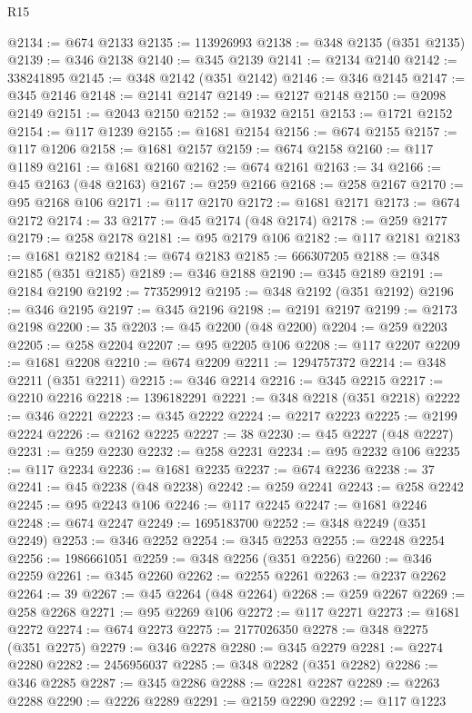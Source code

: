 \begin{lexlean}{R15}
\begin{coremodule}
@2134 := @674 @2133
@2135 := 113926993
@2138 := @348 @2135 (@351 @2135)
@2139 := @346 @2138
@2140 := @345 @2139
@2141 := @2134 @2140
@2142 := 338241895
@2145 := @348 @2142 (@351 @2142)
@2146 := @346 @2145
@2147 := @345 @2146
@2148 := @2141 @2147
@2149 := @2127 @2148
@2150 := @2098 @2149
@2151 := @2043 @2150
@2152 := @1932 @2151
@2153 := @1721 @2152
@2154 := @117 @1239
@2155 := @1681 @2154
@2156 := @674 @2155
@2157 := @117 @1206
@2158 := @1681 @2157
@2159 := @674 @2158
@2160 := @117 @1189
@2161 := @1681 @2160
@2162 := @674 @2161
@2163 := 34
@2166 := @45 @2163 (@48 @2163)
@2167 := @259 @2166
@2168 := @258 @2167
@2170 := @95 @2168 @106
@2171 := @117 @2170
@2172 := @1681 @2171
@2173 := @674 @2172
@2174 := 33
@2177 := @45 @2174 (@48 @2174)
@2178 := @259 @2177
@2179 := @258 @2178
@2181 := @95 @2179 @106
@2182 := @117 @2181
@2183 := @1681 @2182
@2184 := @674 @2183
@2185 := 666307205
@2188 := @348 @2185 (@351 @2185)
@2189 := @346 @2188
@2190 := @345 @2189
@2191 := @2184 @2190
@2192 := 773529912
@2195 := @348 @2192 (@351 @2192)
@2196 := @346 @2195
@2197 := @345 @2196
@2198 := @2191 @2197
@2199 := @2173 @2198
@2200 := 35
@2203 := @45 @2200 (@48 @2200)
@2204 := @259 @2203
@2205 := @258 @2204
@2207 := @95 @2205 @106
@2208 := @117 @2207
@2209 := @1681 @2208
@2210 := @674 @2209
@2211 := 1294757372
@2214 := @348 @2211 (@351 @2211)
@2215 := @346 @2214
@2216 := @345 @2215
@2217 := @2210 @2216
@2218 := 1396182291
@2221 := @348 @2218 (@351 @2218)
@2222 := @346 @2221
@2223 := @345 @2222
@2224 := @2217 @2223
@2225 := @2199 @2224
@2226 := @2162 @2225
@2227 := 38
@2230 := @45 @2227 (@48 @2227)
@2231 := @259 @2230
@2232 := @258 @2231
@2234 := @95 @2232 @106
@2235 := @117 @2234
@2236 := @1681 @2235
@2237 := @674 @2236
@2238 := 37
@2241 := @45 @2238 (@48 @2238)
@2242 := @259 @2241
@2243 := @258 @2242
@2245 := @95 @2243 @106
@2246 := @117 @2245
@2247 := @1681 @2246
@2248 := @674 @2247
@2249 := 1695183700
@2252 := @348 @2249 (@351 @2249)
@2253 := @346 @2252
@2254 := @345 @2253
@2255 := @2248 @2254
@2256 := 1986661051
@2259 := @348 @2256 (@351 @2256)
@2260 := @346 @2259
@2261 := @345 @2260
@2262 := @2255 @2261
@2263 := @2237 @2262
@2264 := 39
@2267 := @45 @2264 (@48 @2264)
@2268 := @259 @2267
@2269 := @258 @2268
@2271 := @95 @2269 @106
@2272 := @117 @2271
@2273 := @1681 @2272
@2274 := @674 @2273
@2275 := 2177026350
@2278 := @348 @2275 (@351 @2275)
@2279 := @346 @2278
@2280 := @345 @2279
@2281 := @2274 @2280
@2282 := 2456956037
@2285 := @348 @2282 (@351 @2282)
@2286 := @346 @2285
@2287 := @345 @2286
@2288 := @2281 @2287
@2289 := @2263 @2288
@2290 := @2226 @2289
@2291 := @2159 @2290
@2292 := @117 @1223

\end{coremodule}
\end{lexlean}
